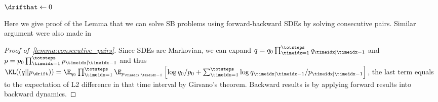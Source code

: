 \begin{algorithm}[!ht]
    \caption{Our method with iterative projections}\label{algo:iterative_proj}
    $\drifthat \gets 0$\  
\end{algorithm}


Here we give proof of the Lemma that we can solve SB problems using forward-backward SDEs by solving consecutive pairs. Similar argument were also made in \citet{chen2019multi}
\begin{proof}[Proof of~\cref{lemma:consecutive_pairs}]
    Since SDEs are Markovian, we can expand $q=q_{0}\prod_{\timeidx=1}^{\totsteps} q_{\timeidx|\timeidx-1}$ and $p=p_{0}\prod_{\timeidx=1}^{\totsteps} p_{\timeidx|\timeidx-1}$ and thus $\KL((q||p_{\drift}))=\E_{q_{0}}\prod_{\timeidx=1}^{\totsteps}\E_{p_{\timeidx|\timeidx-1}}\left[\log q_0/p_0 +\sum_{\timeidx=1}^{\totsteps}\log q_{\timeidx|\timeidx-1}/p_{\timeidx|\timeidx-1} \right]$, the last term equals to the expectation of L2 difference in that time interval by Girsano's theorem. Backward results is by applying forward results into backward dynamics.
\end{proof}

